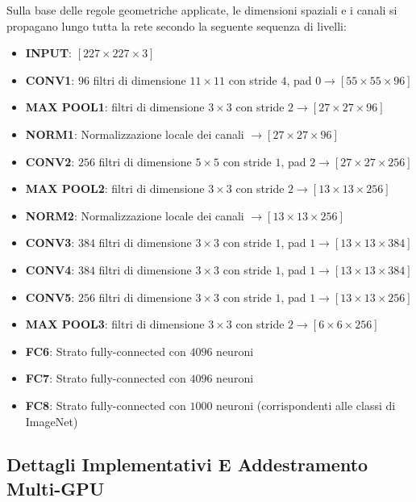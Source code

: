 ﻿\documentclass[11pt, a4paper]{article}
\begin{document}
Sulla base delle regole geometriche applicate, le dimensioni spaziali e i canali si propagano lungo tutta la rete secondo la seguente sequenza di livelli:
\begin{itemize}
    \item \textbf{INPUT}: $[227 \times 227 \times 3]$
    \item \textbf{CONV1}: $96$ filtri di dimensione $11 \times 11$ con stride $4$, pad $0 \rightarrow [55 \times 55 \times 96]$
    \item \textbf{MAX POOL1}: filtri di dimensione $3 \times 3$ con stride $2 \rightarrow [27 \times 27 \times 96]$
    \item \textbf{NORM1}: Normalizzazione locale dei canali $\rightarrow [27 \times 27 \times 96]$
    \item \textbf{CONV2}: $256$ filtri di dimensione $5 \times 5$ con stride $1$, pad $2 \rightarrow [27 \times 27 \times 256]$
    \item \textbf{MAX POOL2}: filtri di dimensione $3 \times 3$ con stride $2 \rightarrow [13 \times 13 \times 256]$
    \item \textbf{NORM2}: Normalizzazione locale dei canali $\rightarrow [13 \times 13 \times 256]$
    \item \textbf{CONV3}: $384$ filtri di dimensione $3 \times 3$ con stride $1$, pad $1 \rightarrow [13 \times 13 \times 384]$
    \item \textbf{CONV4}: $384$ filtri di dimensione $3 \times 3$ con stride $1$, pad $1 \rightarrow [13 \times 13 \times 384]$
    \item \textbf{CONV5}: $256$ filtri di dimensione $3 \times 3$ con stride $1$, pad $1 \rightarrow [13 \times 13 \times 256]$
    \item \textbf{MAX POOL3}: filtri di dimensione $3 \times 3$ con stride $2 \rightarrow [6 \times 6 \times 256]$
    \item \textbf{FC6}: Strato fully-connected con $4096$ neuroni
    \item \textbf{FC7}: Strato fully-connected con $4096$ neuroni
    \item \textbf{FC8}: Strato fully-connected con $1000$ neuroni (corrispondenti alle classi di ImageNet)
\end{itemize}

\subsection{Dettagli Implementativi E Addestramento Multi-GPU}
\end{document}
